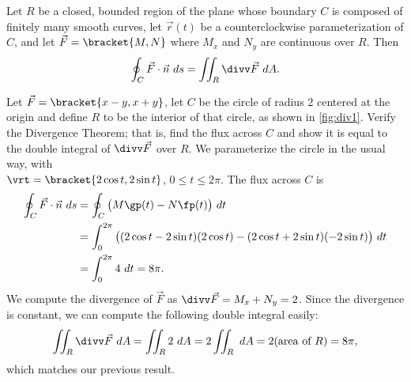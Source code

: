 \begin{theorem}\label{thm:divergence1}
Let $R$ be a closed, bounded region of the plane whose boundary $C$ is composed of finitely many smooth curves, let $\vec r(t)$ be a counterclockwise parameterization of $C$, and let $\vec F =\bracket{M,N}$ where $M_x$ and $N_y$ are continuous over $R$. Then
\[\oint_C \vec F\cdot \vec n\ ds = \iint_R\divv \vec F\ dA.\]
\end{theorem}


{Let $\vec F =\bracket{x-y,x+y}$, let $C$ be the circle of radius 2 centered at the origin and define $R$ to be the interior of that circle, as shown in \autoref{fig:div1}. Verify the Divergence Theorem; that is, find the flux across $C$ and show it is equal to the double integral of $\divv \vec F$ over $R$.}
{We parameterize the circle in the usual way, with\\
$\vrt =\bracket{2\cos t,2\sin t}$, $0\leq t\leq 2\pi$. The flux across $C$ is
\begin{align*}
	\oint_C \vec F\cdot \vec n\ ds
	&= \oint_C\big(M\gp(t)-N\fp(t)\big)\ dt\\
	&= \int_0^{2\pi} \big((2\cos t-2\sin t)(2\cos t) - (2\cos t+2\sin t)(-2\sin t)\big)\ dt\\
	&= \int_0^{2\pi} 4\ dt = 8\pi.
\end{align*}
We compute the divergence of $\vec F$ as $\divv \vec F = M_x+N_y = 2$. Since the divergence is constant, we can compute the following double integral easily:
\[
\iint_R \divv \vec F\ dA = \iint_R 2\ dA = 2\iint_R\ dA
= 2(\text{area of $R$}) = 8\pi,
\]
which matches our previous result.}

